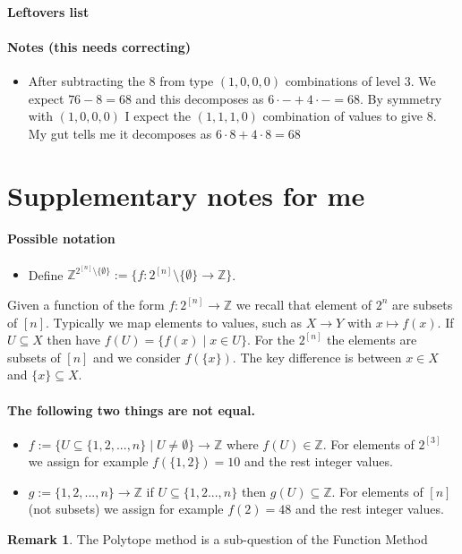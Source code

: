 \documentclass[a4paper,12pt]{article}
\newcounter{example}[]
\theoremstyle{definition}
\theoremstyle{indented}
\newtheorem*{remark}{Remark}
\newenvironment{titlemize}[1]{%
  \paragraph{#1}
  \begin{itemize}}
  {\end{itemize}}
\begin{document}
\begin{titlemize} {Leftovers list}
\begin{titlemize} {Notes (this needs correcting)}
\item 
After subtracting the $8$ from type $(1,0,0,0)$ combinations of level $3$. We expect $76-8=68$ and this decomposes as $6 \cdot - + 4\cdot - = 68$. By symmetry with $(1,0,0,0)$ I expect the $(1,1,1,0)$ combination of values to give $8$. My gut tells me it decomposes as $6 \cdot 8 + 4\cdot 8 = 68$
\end{titlemize}

\end{titlemize}


\item 



\section{Supplementary notes for me}

\begin{titlemize}{Possible notation}
    \item  Define $\mathbb{Z}^{ 2^{[n]} \setminus \{\emptyset\} } := \{ f : 2^{[n]} \setminus \{\emptyset\} \rightarrow \mathbb{Z} \} $. 
\end{titlemize}
 
 

  Given a function of the form $f:2^{[n]} \rightarrow \mathbb{Z}$ we recall that element of $2^{n}$ are subsets of $[n]$. Typically we map elements to values, such as $X \rightarrow Y$ with $ x \mapsto f(x)$. If $U \subseteq X $ then have $f(U)= \{f(x) \mid x \in U \}$. For the $2^{[n]}$ the elements are subsets of $[n]$ and we consider $f(\{ x\})$. The key difference is between $ x \in X$ and $\{x\} \subseteq X$.
      
       \begin{titlemize}{The following two things are not equal.}
          \item  $f:= \{U \subseteq \{1,2,...,n\} \mid U \ne \emptyset\} \rightarrow \mathbb{Z}$ where $f(U) \in \mathbb{Z}$. For elements of $2^{[3]}$ we assign for example $f(\{1,2\})=10$ and the rest integer values.
        \item $g:=\{1,2,...,n\} \rightarrow \mathbb{Z}$ if $U \subseteq \{1,2...,n\}$ then $g(U) \subseteq \mathbb{Z}$. For elements of $[n]$ (not subsets) we assign for example $f(2)=48$ and the rest integer values.
       \end{titlemize}

    \begin{remark}
             The Polytope method is a sub-question of the Function Method
    \end{remark}

\printindex



\end{document}
